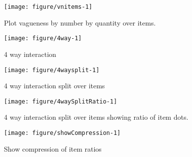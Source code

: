 \documentclass[a4paper]{article}\usepackage[]{graphicx}\usepackage[]{color}
\makeatletter
\def\maxwidth{ %
  \ifdim\Gin@nat@width>\linewidth
    \linewidth
  \else
    \Gin@nat@width
  \fi
}
\newenvironment{knitrout}{}{} %
\makeatother
\begin{document}
\begin{knitrout}
\color{fgcolor}\begin{figure}
\texttt{[image: figure/vnitems-1]} \caption[Plot vagueness by number by quantity over items]{Plot vagueness by number by quantity over items.}\label{fig:vnitems}
\end{figure}


\end{knitrout}

\begin{knitrout}
\color{fgcolor}\begin{figure}
\texttt{[image: figure/4way-1]} \caption[4 way interaction]{4 way interaction}\label{fig:4way}
\end{figure}


\end{knitrout}

\begin{knitrout}
\color{fgcolor}\begin{figure}
\texttt{[image: figure/4waysplit-1]} \caption[4 way interaction split over items]{4 way interaction split over items}\label{fig:4waysplit}
\end{figure}


\end{knitrout}

\begin{knitrout}
\color{fgcolor}\begin{figure}
\texttt{[image: figure/4waySplitRatio-1]} \caption[4 way interaction split over items showing ratio of item dots]{4 way interaction split over items showing ratio of item dots.}\label{fig:4waySplitRatio}
\end{figure}


\end{knitrout}

\begin{knitrout}
\color{fgcolor}\begin{figure}
\texttt{[image: figure/showCompression-1]} \caption[Show compression of item ratios]{Show compression of item ratios}\label{fig:showCompression}
\end{figure}


\end{knitrout}
\end{document}
